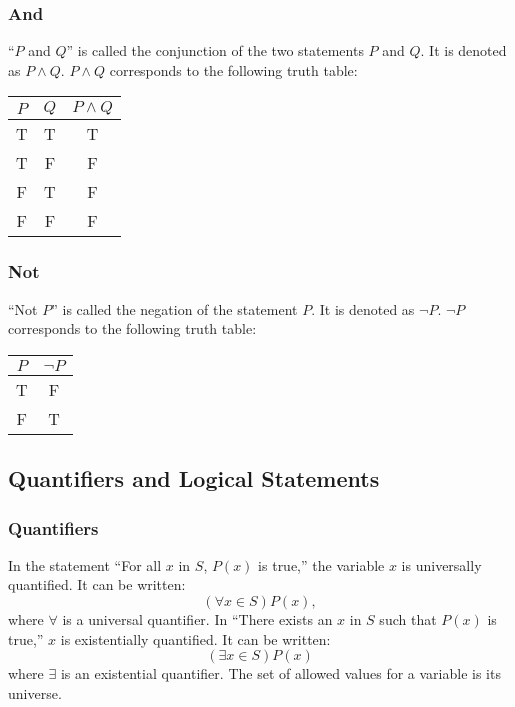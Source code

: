 \documentclass[../main.tex]{subfiles}
\begin{document}
\subsubsection{And}
``$P$ and $Q$'' is called the conjunction of the two statements $P$ and $Q$.
It is denoted as $P \wedge Q$.
$P \wedge Q$ corresponds to the following truth table:
\begin{table}[H]
    \centering
    \begin{tabular}{c|c|c}
        $P$ & $Q$ & $P \wedge Q$ \\ \hline
        T   & T   & T          \\
        T   & F   & F          \\
        F   & T   & F          \\
        F   & F   & F
    \end{tabular}
\end{table}

\subsubsection{Not}
``Not $P$'' is called the negation of the statement $P$.
It is denoted as $\neg P$.
$\neg P$ corresponds to the following truth table:
\begin{table}[H]
    \centering
    \begin{tabular}{c|c}
        $P$ & $\neg P$ \\ \hline
        T   & F        \\
        F   & T
    \end{tabular}
\end{table}

\subsection{Quantifiers and Logical Statements}
\subsubsection{Quantifiers}
\begin{defn} \label{def:quant}
    In the statement ``For all $x$ in $S$, $P(x)$ is true,'' the variable $x$ is \textsf{universally quantified}.
    It can be written:
    \[
        (\forall x \in S) P(x),
    \]
    where $\forall$ is a \textsf{universal quantifier}.
    In ``There exists an $x$ in $S$ such that $P(x)$ is true,'' $x$ is \textsf{existentially quantified}.
    It can be written:
    \[
        (\exists x \in S) P(x)
    \]
    where $\exists$ is an \textsf{existential quantifier}.
    The set of allowed values for a variable is its \textsf{universe}.
\end{defn}
\end{document}
